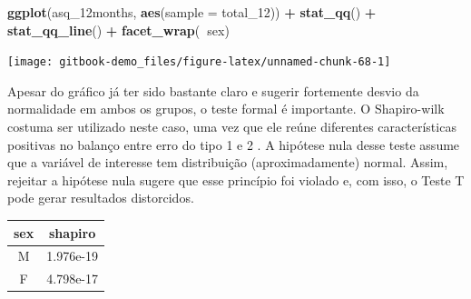 \documentclass[
]{book}
\newenvironment{Shaded}{\begin{snugshade}}{\end{snugshade}}
\newcommand{\DataTypeTok}[1]{\textcolor[rgb]{0.13,0.29,0.53}{#1}}
\newcommand{\DecValTok}[1]{\textcolor[rgb]{0.00,0.00,0.81}{#1}}
\newcommand{\KeywordTok}[1]{\textcolor[rgb]{0.13,0.29,0.53}{\textbf{#1}}}
\newcommand{\NormalTok}[1]{#1}
\newcommand{\OperatorTok}[1]{\textcolor[rgb]{0.81,0.36,0.00}{\textbf{#1}}}
\newcommand{\StringTok}[1]{\textcolor[rgb]{0.31,0.60,0.02}{#1}}
\begin{document}
\begin{Shaded}
\begin{Highlighting}[]
\KeywordTok{ggplot}\NormalTok{(asq_12months, }\KeywordTok{aes}\NormalTok{(}\DataTypeTok{sample =}\NormalTok{ total_}\DecValTok{12}\NormalTok{)) }\OperatorTok{+}\StringTok{ }
\StringTok{  }\KeywordTok{stat_qq}\NormalTok{() }\OperatorTok{+}\StringTok{ }
\StringTok{  }\KeywordTok{stat_qq_line}\NormalTok{() }\OperatorTok{+}
\StringTok{  }\KeywordTok{facet_wrap}\NormalTok{(}\OperatorTok{~}\NormalTok{sex)}
\end{Highlighting}
\end{Shaded}

\begin{center}\texttt{[image: gitbook-demo\_files/figure-latex/unnamed-chunk-68-1]} \end{center}

Apesar do gráfico já ter sido bastante claro e sugerir fortemente desvio da normalidade em ambos os grupos, o teste formal é importante. O Shapiro-wilk costuma ser utilizado neste caso, uma vez que ele reúne diferentes características positivas no balanço entre erro do tipo 1 e 2 \citep{Yap2011}. A hipótese nula desse teste assume que a variável de interesse tem distribuição (aproximadamente) normal. Assim, rejeitar a hipótese nula sugere que esse princípio foi violado e, com isso, o Teste T pode gerar resultados distorcidos.

\begin{Shaded}
\end{Shaded}

\begin{longtable}[]{@{}cc@{}}
\toprule
\begin{minipage}[b]{0.08\columnwidth}\centering
sex\strut
\end{minipage} & \begin{minipage}[b]{0.16\columnwidth}\centering
shapiro\strut
\end{minipage}\tabularnewline
\midrule
\endhead
\begin{minipage}[t]{0.08\columnwidth}\centering
M\strut
\end{minipage} & \begin{minipage}[t]{0.16\columnwidth}\centering
1.976e-19\strut
\end{minipage}\tabularnewline
\begin{minipage}[t]{0.08\columnwidth}\centering
F\strut
\end{minipage} & \begin{minipage}[t]{0.16\columnwidth}\centering
4.798e-17\strut
\end{minipage}\tabularnewline
\bottomrule
\end{longtable}
\end{document}
